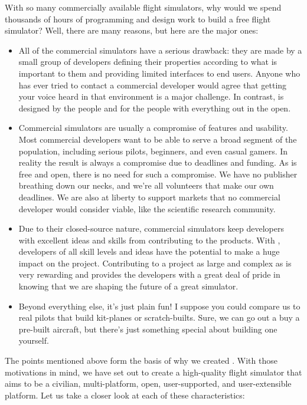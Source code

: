 With so many commercially available flight simulators, why would we spend
thousands of hours of programming and design work to build a free flight
simulator?  Well, there are many reasons, but here are the major ones:

\begin{itemize}
 \item All of the commercial simulators have a serious drawback: they are made
 by a small group of developers defining their properties according to what
 is important to them and providing limited interfaces to end users.  Anyone
 who has ever tried to contact a commercial developer would agree that getting
 your voice heard in that environment is a major challenge.  In contrast,
 \FlightGear{} is designed by the people and for the people with everything
 out in the open.

 \item Commercial simulators are usually a compromise of features and
 usability.  Most commercial developers want to be able to serve a broad
 segment of the population, including serious pilots, beginners, and even
 casual gamers.
 In reality the result is always a compromise due to deadlines and
 funding.  As \FlightGear{} is free and open, there is no need for such
 a compromise.  We have no publisher breathing down our necks, and
 we're all volunteers that make our own deadlines.  We are also at
 liberty to support markets that no commercial developer would consider
 viable, like the scientific research community.
 \item Due to their closed-source nature, commercial simulators keep developers
 with excellent ideas and skills from contributing to the products.  With
 \FlightGear{}, developers of all skill levels and ideas have the potential
 to make a huge impact on the project.  Contributing to a project as large
 and complex as \FlightGear{} is very rewarding and provides the developers
 with a great deal of pride in knowing that we are shaping the future of a
 great simulator.
 \item Beyond everything else, it's just plain fun!  I suppose you could
 compare us to real pilots that build kit-planes or scratch-builts.  Sure,
 we can go out a buy a pre-built aircraft, but there's just something special
 about building one yourself.
\end{itemize}

The points mentioned above form the basis of why we created \FlightGear{}.
With those motivations in mind, we have set out to create a high-quality
flight simulator that aims to be a civilian,
multi-platform, open,
user-supported, and user-extensible platform.  Let us take a closer look at each of these
characteristics:

